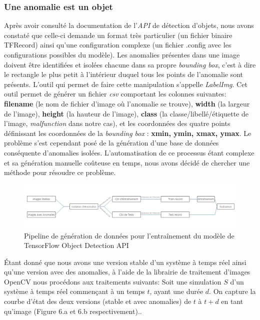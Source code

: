 \documentclass[french]{article}
\theoremstyle{mytheoremstyle}
\theoremstyle{mytheoremstyle}
\theoremstyle{myproblemstyle}
\begin{document}
        \subsubsection{Une anomalie est un objet}
        Après avoir consulté la documentation de l'\emph{API} de détection d'objets, nous avons constaté que celle-ci demande un format très particulier (un fichier binaire TFRecord) ainsi qu'une configuration complexe (un fichier .config avec les configurations possibles du modèle). Les anomalies présentes dans une image doivent être identifiées et isolées chacune dans sa propre \emph{bounding box}, c'est à dire le rectangle le plus petit à l'intérieur duquel tous les points de l'anomalie sont présents. L'outil qui permet de faire cette manipulation s'appelle \emph{LabelImg}. Cet outil permet de générer un fichier \emph{csv} comportant les colonnes suivantes: \textbf{filename} (le nom de fichier d'image où l'anomalie se trouve), \textbf{width} (la largeur de l'image), \textbf{height} (la hauteur de l'image), \textbf{class} (la classe/libellé/étiquette de l'image, \emph{malfunction} dans notre cas), et les coordonnées des quatre points définissant les coordonnées de la \emph{bounding box} : \textbf{xmin, ymin, xmax, ymax}. Le problème s'est cependant posé de la génération d'une  base de données conséquente d'anomalies isolées. L'automatisation de ce processus étant complexe et sa génération manuelle coûteuse en temps, nous avons décidé de chercher une méthode pour résoudre ce problème.
        \begin{figure}[H]
            \centering
            \includegraphics[width=\textwidth]{images/od_datagen.jpg}
            \caption{Pipeline de génération de données pour l'entraînement du modèle de TensorFlow Object Detection API}
            \label{}
        \end{figure}
        \indent Étant donné que nous avons une version stable d'un système à temps réel ainsi qu'une version avec des anomalies, à l'aide de la librairie de traitement d'images OpenCV nous procédons aux traitements suivants:
        \newline
        Soit une simulation $S$ d'un système à temps réel commençant à un temps $t$, ayant une durée $d$. On capture la courbe d'état des deux versions (stable et avec anomalies) de $t$ à $t+d$ en tant qu'image (Figure 6.a et 6.b respectivement)..
\end{document}
